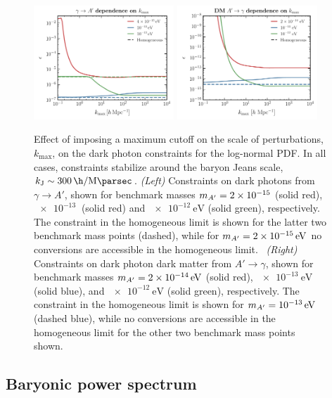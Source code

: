 \documentclass[prd,aps,10pt,nofootinbib,twocolumn,superscriptaddress,preprintnumbers,balancelastpage,longbibliography]{revtex4-1}
\begin{document}
%
\begin{figure}[tbp]
    \centering
    \includegraphics[width=0.47\textwidth]{plots/limit_dp_k_max}
    \includegraphics[width=0.47\textwidth]{plots/limit_DP_DM_k_max}
    \caption{Effect of imposing a maximum cutoff on the scale of perturbations, $k_\mathrm{max}$, on the dark photon constraints for the log-normal PDF. In all cases, constraints stabilize around the baryon Jeans scale, $k_\mathrm{J}\sim \SI{300}{\h\per\mega\parsec}$. \emph{(Left)} Constraints on dark photons from $\gamma\to A'$, shown for benchmark masses $m_{A^\prime} = \SI{2e-15}{}$ (solid red), $\SI{e-13}{}$ (solid red) and $\SI{e-12}{\eV}$ (solid green), respectively. The constraint in the homogeneous limit is shown for the latter two benchmark mass points (dashed), while for $\mAp = \SI{2e-15}{\eV}$ no conversions are accessible in the homogeneous limit.~ \emph{(Right)} Constraints on dark photon dark matter from $A'\to \gamma$, shown for benchmark masses $\mAp = \SI{2e-14}{\eV}$ (solid red), $\SI{e-13}{\eV}$ (solid blue), and $\SI{e-12}{\eV}$ (solid green), respectively. The constraint in the homogeneous limit is shown for $\mAp = \SI{e-13}{\eV}$ (dashed blue), while no conversions are accessible in the homogeneous limit for the other two benchmark mass points shown.~ } 
    \label{fig:limit_k_max_dep}
\end{figure}
%

\subsection{Baryonic power spectrum}
\end{document}

